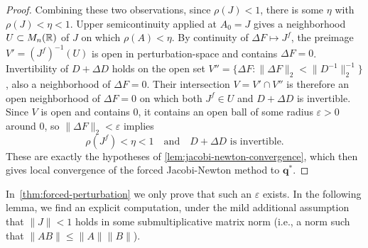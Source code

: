 \begin{proof}
	Combining these two observations, since $\rho(J) < 1$, there is some $\eta$ with $\rho(J) < \eta < 1$. Upper semicontinuity applied at $A_0 = J$ gives a neighborhood $U \subset M_n({\mathbb{R}})$ of $J$ on which $\rho(A) < \eta$. By continuity of $\Delta F \mapsto J^f$, the preimage $V' = (J^f)^{-1}(U)$ is open in perturbation-space and contains $\Delta F = 0$. Invertibility of $D + \Delta D$ holds on the open set $V'' = \{ \Delta F : \|\Delta F\|_2 < \|D^{-1}\|_2^{-1}\}$, also a neighborhood of $\Delta F = 0$. Their intersection $V = V' \cap V''$ is therefore an open neighborhood of $\Delta F = 0$ on which both $J^f \in U$ and $D + \Delta D$ is invertible. Since $V$ is open and contains $0$, it contains an open ball of some radius $\varepsilon > 0$ around $0$, so $\|\Delta F\|_2 < \varepsilon$ implies
	\[
		\rho(J^f) < \eta < 1 \quad\text{and}\quad D + \Delta D \text{ is invertible.}
	\]
	These are exactly the hypotheses of \cref{lem:jacobi-newton-convergence}, which then gives local convergence of the forced Jacobi-Newton method to $\mathbf{q}^*$.

\end{proof}

In~\cref{thm:forced-perturbation} we only prove that such an $\varepsilon$ exists. In the following lemma, we find an explicit computation, under the mild additional assumption that $\|J\| < 1$ holds in some submultiplicative matrix norm (i.e., a norm such that $\|A B\| \leq \|A\| \|B\|$). 

